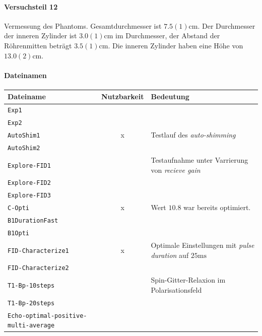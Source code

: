 \documentclass{subfiles}
\begin{document}
\paragraph*{Versuchsteil 12}
    Vermessung des Phantoms. Gesamtdurchmesser ist $7.5(1)\si{\cm}$. Der Durchmesser der inneren Zylinder ist $3.0(1)\si{\cm}$ im Durchmesser, der Abstand der Röhrenmitten beträgt $3.5(1)\si{\cm}$. Die inneren Zylinder haben eine Höhe von $13.0(2)\si{\cm}$.

\paragraph*{Dateinamen}

\begin{table}[H]
    \centering
    \begin{tabular}{p{4cm}|c|p{6cm}}
        \textbf{Dateiname} & \textbf{Nutzbarkeit} & \textbf{Bedeutung} \\
        \hline\hline
        \texttt{Exp1} & & \\
        \texttt{Exp2} & & \\
        \hline
        \texttt{AutoShim1} & x & Testlauf des \emph{auto-shimming} \\
        \texttt{AutoShim2} & & \\
        \hline
        \texttt{Explore-FID1} & & Testaufnahme unter Varrierung von \emph{recieve gain} \\
        \texttt{Explore-FID2} & & \\
        \texttt{Explore-FID3} & & \\
        \hline
        \texttt{C-Opti} & x & Wert $10.8$ war bereits optimiert. \\
        \hline
        \texttt{B1DurationFast} & & \\
        \texttt{B1Opti} & & \\
        \hline
        \texttt{FID-Characterize1} & x & Optimale Einstellungen mit \emph{pulse duration} auf $25\si{\ms}$\\
        \texttt{FID-Characterize2} & & \\
        \hline
        \texttt{T1-Bp-10steps} & & Spin-Gitter-Relaxion im Polarisationsfeld \\
        \texttt{T1-Bp-20steps} & & \\
        \hline
        \texttt{Echo-optimal-}\texttt{positive-multi-average} & & \\
    \end{tabular}
\end{table}
                
        
\end{document}
